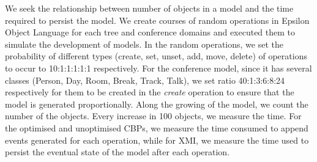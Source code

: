 \documentclass{llncs}
\begin{document}
We seek the relationship between number of objects in a model and the time required to persist the model. We create courses of random operations in Epsilon Object Language \cite{kolovos2006epsilon} for each tree and conference domains and executed them to simulate the development of models. In the random operations, we set the probability of different types (create, set, unset, add, move, delete) of operations to occur to 10:1:1:1:1:1 respectively. For the conference model, since it has several classes (Person, Day, Room, Break, Track, Talk), we set ratio 40:1:3:6:8:24 respectively for them to be created in the \emph{create} operation to ensure that the model is generated proportionally. Along the growing of the model, we count the number of the objects. Every increase in 100 objects, we measure the time. For  the optimised and unoptimised CBPs, we measure the time consumed to append events generated for each operation, while for XMI, we measure the time used to persist the eventual state of the model after each operation. 
\end{document}
